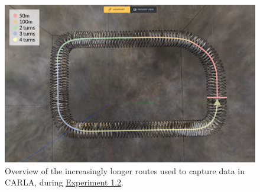 \begin{figure}[!h]
    \centering
    \includegraphics[width=1.0\textwidth]{figures/capacity-overview.png}
    \caption[Overview of the segments used in Experiment 1.2.]{Overview of the increasingly longer routes used to capture data in CARLA, during \hyperref[sec:exp-capacity]{Experiment 1.2}.}
    \label{fig:capacity-overview}
\end{figure}